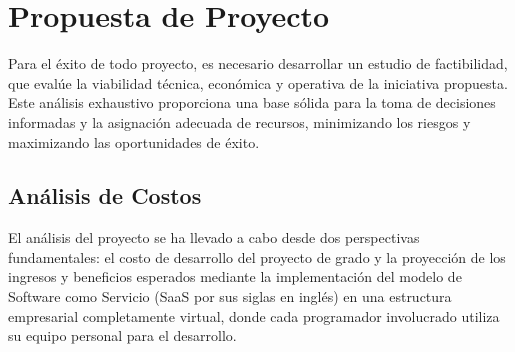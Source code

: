 \chapter{Propuesta de Proyecto}
\label{sec:propuesta}

Para el éxito de todo proyecto, es necesario desarrollar un estudio de factibilidad, que evalúe la viabilidad técnica, económica y operativa de la iniciativa propuesta.  Este análisis exhaustivo proporciona una base sólida para la toma de decisiones informadas y la asignación adecuada de recursos, minimizando los riesgos y maximizando las oportunidades de éxito.

\section{Análisis de Costos}

El análisis del proyecto se ha llevado a cabo desde dos perspectivas fundamentales: el costo de desarrollo del proyecto de grado y la proyección de los ingresos y beneficios esperados mediante la implementación del modelo de Software como Servicio (SaaS por sus siglas en inglés) en una estructura empresarial completamente virtual, donde cada programador involucrado utiliza su equipo personal para el desarrollo.

